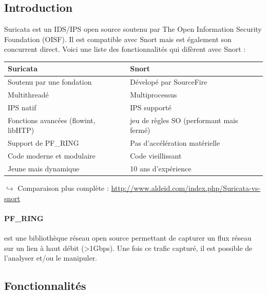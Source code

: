 \documentclass[a4paper,11pt,french]{article}
\begin{document}
\subsection{Introduction}

Suricata est un IDS/IPS open source soutenu par The Open Information Security Foundation (OISF). Il est compatible avec Snort mais est également son concurrent direct. Voici une liste des fonctionnalités qui difèrent avec Snort :

\begin{center}
\begin{tabularx}{15cm}{|X|X|}
\hline
\textbf{Suricata}&\textbf{Snort}\\
\hline
Soutenu par une fondation  & Dévelopé par SourceFire\\
Multithreadé & Multiprocessus\\
IPS natif & IPS supporté\\
Fonctions avancées (flowint, libHTP) & jeu de règles SO (performant mais fermé)\\
Support de PF\_RING & Pas d'accélération matérielle\\
Code moderne et modulaire &  Code vieillissant\\
Jeune mais dynamique &  10 ans d'expérience\\
\hline
\end{tabularx}
\end{center}

$\hookrightarrow$ Comparaison plus complète : \url{http://www.aldeid.com/index.php/Suricata-vs-snort}


\paragraph{PF\_RING} est une bibliothèque réseau open source permettant de capturer un flux réseau sur un lien à haut débit (>1Gbps). Une fois ce trafic capturé, il est possible de l’analyser et/ou le manipuler.

\subsection{Fonctionnalités}
\end{document}
